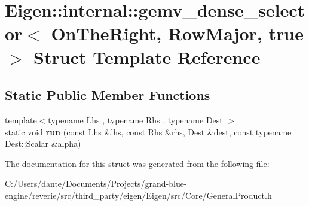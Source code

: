 \hypertarget{struct_eigen_1_1internal_1_1gemv__dense__selector_3_01_on_the_right_00_01_row_major_00_01true_01_4}{}\section{Eigen\+::internal\+::gemv\+\_\+dense\+\_\+selector$<$ On\+The\+Right, Row\+Major, true $>$ Struct Template Reference}
\label{struct_eigen_1_1internal_1_1gemv__dense__selector_3_01_on_the_right_00_01_row_major_00_01true_01_4}
\subsection*{Static Public Member Functions}
\begin{DoxyCompactItemize}
\item 
\mbox{\label{struct_eigen_1_1internal_1_1gemv__dense__selector_3_01_on_the_right_00_01_row_major_00_01true_01_4_a58d2254655edbf6807aa0b60906ef5f9}} 
{\footnotesize template$<$typename Lhs , typename Rhs , typename Dest $>$ }\\static void {\bfseries run} (const Lhs \&lhs, const Rhs \&rhs, Dest \&dest, const typename Dest\+::\+Scalar \&alpha)
\end{DoxyCompactItemize}


The documentation for this struct was generated from the following file\+:\begin{DoxyCompactItemize}
\item 
C\+:/\+Users/dante/\+Documents/\+Projects/grand-\/blue-\/engine/reverie/src/third\+\_\+party/eigen/\+Eigen/src/\+Core/General\+Product.\+h\end{DoxyCompactItemize}
